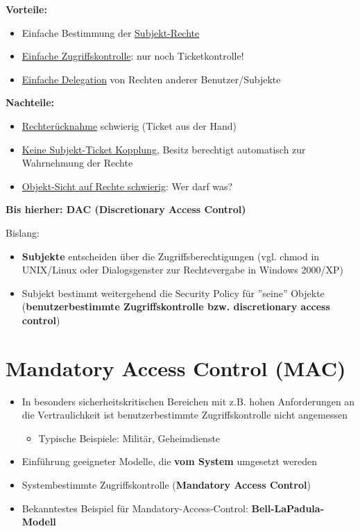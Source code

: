 \documentclass[openany]{book}
\begin{document}
\textbf{Vorteile:}
\begin{itemize}
\item Einfache Bestimmung der \underline{Subjekt-Rechte}
\item \underline{Einfache Zugriffskontrolle}: nur noch Ticketkontrolle!
\item \underline{Einfache Delegation} von Rechten anderer Benutzer/Subjekte
\end{itemize}

\textbf{Nachteile:}
\begin{itemize}
\item \underline{Rechterücknahme} schwierig (Ticket aus der Hand)
\item \underline{Keine Subjekt-Ticket Kopplung}, Besitz berechtigt automatisch zur Wahrnehmung der Rechte
\item \underline{Objekt-Sicht auf Rechte schwierig}: Wer darf was?
\end{itemize}

\textbf{Bis hierher: DAC (Discretionary Access Control)}

Bislang:
\begin{itemize}
\item \textbf{Subjekte} entscheiden über die Zugriffsberechtigungen (vgl. chmod in UNIX/Linux oder Dialogsgenster zur Rechtevergabe in Windows 2000/XP)
\item Subjekt bestimmt weitergehend die Security Policy für ''seine'' Objekte (\textbf{benutzerbestimmte Zugriffskontrolle bzw. discretionary access control})
\end{itemize}

\section{Mandatory Access Control (MAC)}
\begin{itemize}
\item In besonders sicherheitskritischen Bereichen mit z.B. hohen Anforderungen an die Vertraulichkeit ist benutzerbestimmte Zugriffskontrolle nicht angemessen
\begin{itemize}
\item Typische Beispiele: Militär, Geheimdienste
\end{itemize}
\item Einführung geeigneter Modelle, die \textbf{vom System} umgesetzt wereden
\item Systembestimmte Zugriffskontrolle (\textbf{Mandatory Access Control})
\item Bekanntestes Beispiel für Mandatory-Access-Control: \textbf{Bell-LaPadula-Modell}
\end{itemize}
\end{document}
